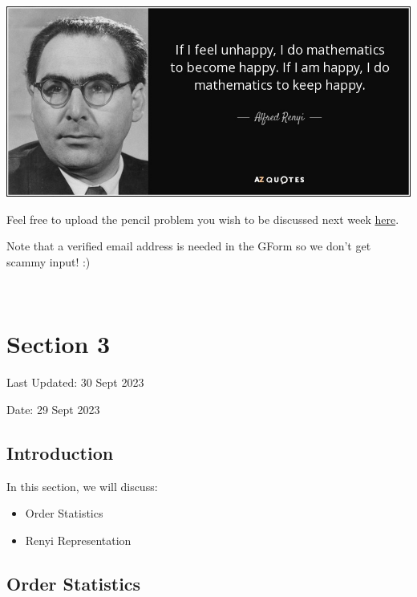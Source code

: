 \documentclass[
  letterpaper,
  DIV=11,
  numbers=noendperiod]{scrreprt}
\providecommand{\tightlist}{%
  \setlength{\itemsep}{0pt}\setlength{\parskip}{0pt}}\usepackage{longtable,booktabs,array}
\theoremstyle{plain}
\theoremstyle{definition}
\theoremstyle{remark}
\begin{document}
\includegraphics{./assets/img/renyi.jpeg}

Feel free to upload the pencil problem you wish to be discussed next
week \href{https://forms.gle/RBmMNYJp4u3qD5W79}{here}.

Note that a verified email address is needed in the GForm so we don't
get scammy input! :)

\(\,\)


\hypertarget{section-3}{%
\chapter*{Section 3}\label{section-3}}


Last Updated: 30 Sept 2023

Date: 29 Sept 2023

\hypertarget{introduction-2}{%
\section*{Introduction}\label{introduction-2}}


In this section, we will discuss:

\begin{itemize}
\tightlist
\item
  Order Statistics
\item
  Renyi Representation
\end{itemize}

\hypertarget{order-statistics}{%
\section*{Order Statistics}\label{order-statistics}}
\end{document}
